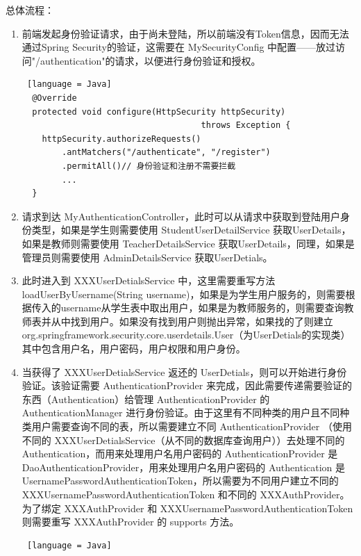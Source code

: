 \begin{enumerate}
\begin{enumerate}
\begin{enumerate}
                    \end{enumerate}
          \end{enumerate}
          总体流程：
          \begin{enumerate}
              \item 前端发起身份验证请求，由于尚未登陆，所以前端没有Token信息，因而无法通过Spring Security的验证，这需要在 MySecurityConfig 中配置——放过访问"/authentication"的请求，以便进行身份验证和授权。\begin{lstlisting} [language = Java]
  @Override
  protected void configure(HttpSecurity httpSecurity)
                                    throws Exception {
    httpSecurity.authorizeRequests()
        .antMatchers("/authenticate", "/register")
        .permitAll()// 身份验证和注册不需要拦截
        ...
  }
              \end{lstlisting}
              \item 请求到达 MyAuthenticationController，此时可以从请求中获取到登陆用户身份类型，如果是学生则需要使用 StudentUserDetailService 获取UserDetails，如果是教师则需要使用 TeacherDetailsService 获取UserDetails，同理，如果是管理员则需要使用 AdminDetailsService 获取UserDetials。
              \item 此时进入到 XXXUserDetialsService 中，这里需要重写方法 loadUserByUsername(String username)，如果是为学生用户服务的，则需要根据传入的username从学生表中取出用户，如果是为教师服务的，则需要查询教师表并从中找到用户。如果没有找到用户则抛出异常，如果找的了则建立 org.springframework.security.core.userdetails.User（为UserDetials的实现类）其中包含用户名，用户密码，用户权限和用户身份。
              \item 当获得了 XXXUserDetialsService 返还的 UserDetials，则可以开始进行身份验证。该验证需要 AuthenticationProvider 来完成，因此需要传递需要验证的东西（Authentication）给管理 AuthenticationProvider 的 AuthenticationManager 进行身份验证。由于这里有不同种类的用户且不同种类用户需要查询不同的表，所以需要建立不同 AuthenticationProvider （使用不同的 XXXUserDetialsService（从不同的数据库查询用户））去处理不同的 Authentication，而用来处理用户名用户密码的 AuthenticationProvider 是 DaoAuthenticationProvider，用来处理用户名用户密码的 Authentication 是 UsernamePasswordAuthenticationToken，所以需要为不同用户建立不同的 XXXUsernamePasswordAuthenticationToken 和不同的 XXXAuthProvider。为了绑定 XXXAuthProvider 和 XXXUsernamePasswordAuthenticationToken 则需要重写 XXXAuthProvider 的 supports 方法。
                    \begin{lstlisting} [language = Java]

\end{lstlisting}
\end{enumerate}
\end{enumerate}
